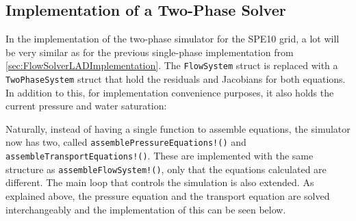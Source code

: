 \subsection{Implementation of a Two-Phase Solver}
In the implementation of the two-phase simulator for the SPE10 grid, a lot will be very similar as for the previous single-phase implementation from \autoref{sec:FlowSolverLADImplementation}. The \texttt{FlowSystem} struct is replaced with a \texttt{TwoPhaseSystem} struct that hold the residuals and Jacobians for both equations. In addition to this, for implementation convenience purposes, it also holds the current pressure and water saturation:

Naturally, instead of having a single function to assemble equations, the simulator now has two, called \texttt{assemblePressureEquations!()} and \texttt{assembleTransportEquations!()}. These are implemented with the same structure as \texttt{assembleFlowSystem!()}, only that the equations calculated are different. The main loop that controls the simulation is also extended. As explained above, the pressure equation and the transport equation are solved interchangeably and the implementation of this can be seen below.


